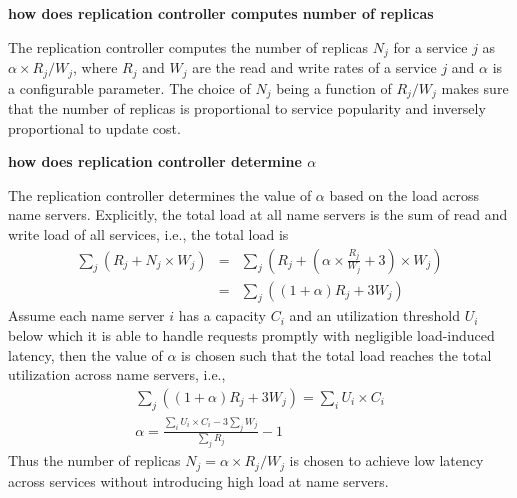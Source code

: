 {{{\bf how does replication controller computes number of replicas}

The replication controller computes the number of replicas $N_j$ for a service $j$ as $\alpha \times R_j/W_j$, where $R_j$ and $W_j$ are the read and write rates of a service $j$ and $\alpha$ is a configurable parameter. The choice of $N_j$ being a function of $R_j/W_j$ makes sure that the number of replicas is proportional to service popularity and inversely proportional to update cost.

{\bf how does replication controller determine $\alpha$}

The replication controller determines the value of $\alpha$ based on the load across name servers. Explicitly, the total load at all name servers is the sum of read and write load of all services, i.e., the total load is
\begin{eqnarray}
\sum_j (R_j + N_j \times W_j) & = & \sum_j (R_j + (\alpha \times \frac{R_j}{W_j} + 3) \times W_j)\nonumber \\ 
& = & \sum_j ((1 + \alpha)R_j + 3W_j)
\end{eqnarray}
Assume each name server $i$ has a capacity $C_i$ and an utilization threshold $U_i$ below which it is able to handle requests promptly with negligible load-induced latency, then the value of $\alpha$ is chosen such that the total load reaches the total utilization across name servers, i.e., 
\begin{eqnarray}
 \sum_j ( (1 + \alpha) R_j + 3W_j) = \sum_i U_i \times C_i \nonumber \\
\alpha  =   \frac{\sum_i U_i \times C_i - 3\sum_jW_j}{\sum_j R_j} - 1 
\end{eqnarray}
Thus the number of replicas $N_j = \alpha \times R_j/W_j$ is chosen to achieve low latency across services without introducing high load at name servers.

%

}}
